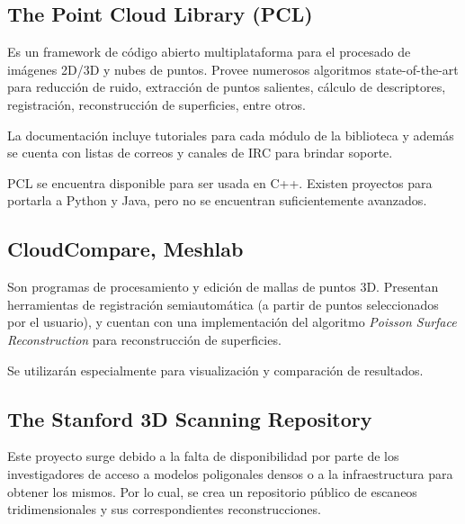 \documentclass{pfc}
\begin{document}

		\subsection{The Point Cloud Library (PCL)}

			Es un framework de código abierto multiplataforma para el procesado de imágenes 2D/3D y nubes de puntos.
			Provee numerosos algoritmos state-of-the-art %
			para reducción de ruido, extracción de puntos salientes,
			cálculo de descriptores, registración,
			reconstrucción de superficies, entre otros.

			La documentación incluye tutoriales para cada módulo de la biblioteca
			y además se cuenta con listas de correos
			y canales de IRC para brindar soporte.


			PCL se encuentra disponible para ser usada en C++.
			Existen proyectos para portarla a Python y Java,
			pero no se encuentran suficientemente avanzados.

		\subsection{CloudCompare, Meshlab}
			Son programas de procesamiento y edición de mallas de puntos 3D.
			Presentan herramientas de registración semiautomática (a partir de
			puntos seleccionados por el usuario), y cuentan con una
			implementación del algoritmo \emph{Poisson Surface Reconstruction}
			para reconstrucción de superficies.

			Se utilizarán especialmente para visualización
			y comparación de resultados.

		\subsection{The Stanford 3D Scanning Repository}

			Este proyecto surge debido a la falta de disponibilidad
			por parte de los investigadores
			de acceso a modelos poligonales densos
				o a la infraestructura para obtener los mismos.
			Por lo cual, se crea un repositorio público de
			escaneos tridimensionales y sus correspondientes reconstrucciones.
\end{document}
